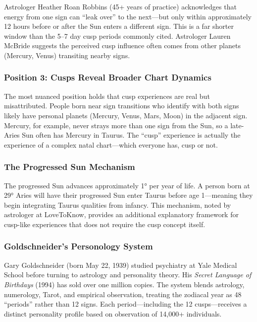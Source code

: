 \documentclass[11pt,letterpaper]{article}
\begin{document}
Astrologer Heather Roan Robbins (45+ years of practice) acknowledges that energy from one sign can ``leak over'' to the next---but only within approximately 12 hours before or after the Sun enters a different sign. This is a far shorter window than the 5--7 day cusp periods commonly cited. Astrologer Lauren McBride suggests the perceived cusp influence often comes from other planets (Mercury, Venus) transiting nearby signs.

\subsubsection{Position 3: Cusps Reveal Broader Chart Dynamics}

The most nuanced position holds that cusp experiences are real but misattributed. People born near sign transitions who identify with both signs likely have personal planets (Mercury, Venus, Mars, Moon) in the adjacent sign. Mercury, for example, never strays more than one sign from the Sun, so a late-Aries Sun often has Mercury in Taurus. The ``cusp'' experience is actually the experience of a complex natal chart---which everyone has, cusp or not.

\subsubsection{The Progressed Sun Mechanism}

The progressed Sun advances approximately 1° per year of life. A person born at 29° Aries will have their progressed Sun enter Taurus before age 1---meaning they begin integrating Taurus qualities from infancy. This mechanism, noted by astrologer at LoveToKnow, provides an additional explanatory framework for cusp-like experiences that does not require the cusp concept itself.

\subsubsection{Goldschneider's Personology System}

Gary Goldschneider (born May 22, 1939) studied psychiatry at Yale Medical School before turning to astrology and personality theory. His \textit{Secret Language of Birthdays} (1994) has sold over one million copies. The system blends astrology, numerology, Tarot, and empirical observation, treating the zodiacal year as 48 ``periods'' rather than 12 signs. Each period---including the 12 cusps---receives a distinct personality profile based on observation of 14,000+ individuals.
\end{document}
